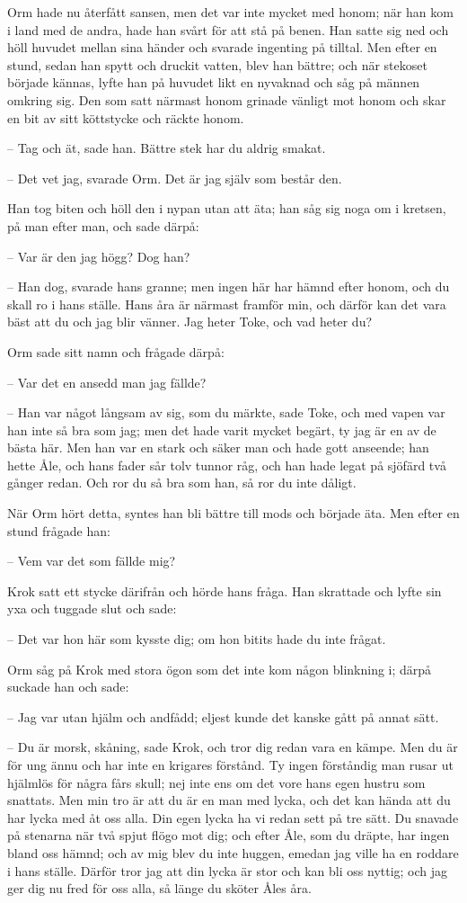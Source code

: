 \initial Orm hade nu återfått sansen, men det var inte mycket med honom; när han kom i land med de andra, hade han svårt för att stå på benen. Han satte sig ned och höll huvudet mellan sina händer och svarade ingenting på tilltal. Men efter en stund, sedan han spytt och druckit vatten, blev han bättre; och när stekoset började kännas, lyfte han på huvudet likt en nyvaknad och såg på männen omkring sig. Den som satt närmast honom grinade vänligt mot honom och skar en bit av sitt köttstycke och räckte honom.

– Tag och ät, sade han. Bättre stek har du aldrig smakat.

– Det vet jag, svarade Orm. Det är jag själv som består den.

Han tog biten och höll den i nypan utan att äta; han såg sig noga om i kretsen, på man efter man, och sade därpå:

– Var är den jag högg? Dog han?

– Han dog, svarade hans granne; men ingen här har hämnd efter honom, och du skall ro i hans ställe. Hans åra är närmast framför min, och därför kan det vara bäst att du och jag blir vänner. Jag heter Toke, och vad heter du?

Orm sade sitt namn och frågade därpå:

– Var det en ansedd man jag fällde?

– Han var något långsam av sig, som du märkte, sade Toke, och med vapen var han inte så bra som jag; men det hade varit mycket begärt, ty jag är en av de bästa här. Men han var en stark och säker man och hade gott anseende; han hette Åle, och hans fader sår tolv tunnor råg, och han hade legat på sjöfärd två gånger redan. Och ror du så bra som han, så ror du inte dåligt.

\initial När Orm hört detta, syntes han bli bättre till mods och började äta. Men efter en stund frågade han:

– Vem var det som fällde mig?

Krok satt ett stycke därifrån och hörde hans fråga. Han skrattade och lyfte sin yxa och tuggade slut och sade:

– Det var hon här som kysste dig; om hon bitits hade du inte frågat.

Orm såg på Krok med stora ögon som det inte kom någon blinkning i; därpå suckade han och sade:

– Jag var utan hjälm och andfådd; eljest kunde det kanske gått på annat sätt.

– Du är morsk, skåning, sade Krok, och tror dig redan vara en kämpe. Men du är för ung ännu och har inte en krigares förstånd. Ty ingen förståndig man rusar ut hjälmlös för några fårs skull; nej inte ens om det vore hans egen hustru som snattats. Men min tro är att du är en man med lycka, och det kan hända att du har lycka med åt oss alla. Din egen lycka ha vi redan sett på tre sätt. Du snavade på stenarna när två spjut flögo mot dig; och efter Åle, som du dräpte, har ingen bland oss hämnd; och av mig blev du inte huggen, emedan jag ville ha en roddare i hans ställe. Därför tror jag att din lycka är stor och kan bli oss nyttig; och jag ger dig nu fred för oss alla, så länge du sköter Åles åra.

